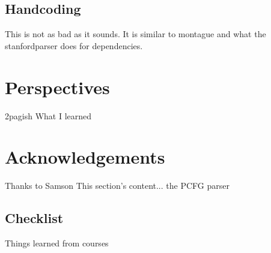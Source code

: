 \documentclass[12pt]{article}
\let\stdsection\section
\renewcommand\section{\newpage\stdsection}
\begin{document}
\subsection{Handcoding}
This is not as bad as it sounds. It is similar to montague and what the stanfordparser does for dependencies.

\section{Perspectives}
2pagish
What I learned

\section*{Acknowledgements}
Thanks to Samson
This section's content...\cite{visser1999donkey}
the PCFG parser\cite{klein2003accurate}

\subsection{Checklist}
Things learned from courses




\end{document}
